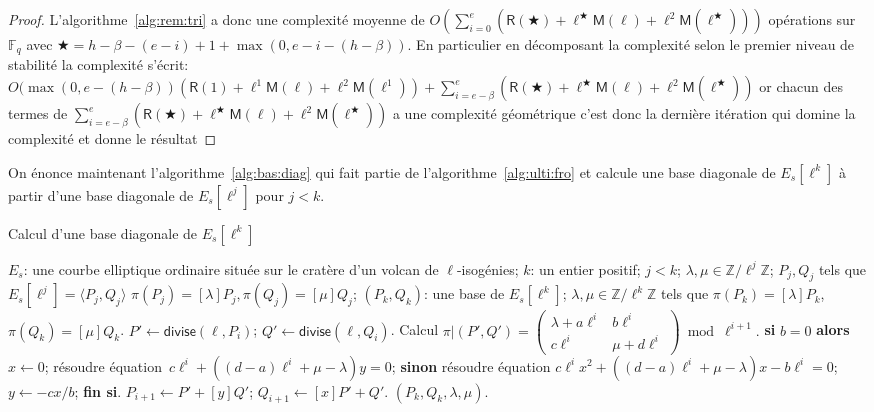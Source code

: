 \documentclass[10pt,a4paper]{book}
\theoremstyle{plain}
\theoremstyle{definition}
\theoremstyle{definition}
\theoremstyle{definition}
\theoremstyle{definition}
\theoremstyle{remark}
\theoremstyle{remark}
\theoremstyle{definition}
\begin{document}
\begin{proof}
L'algorithme~\ref{alg:rem:tri} a donc une complexité moyenne de 
$O(\sum_{i=0}^{e}(\mathsf{R}(\bigstar)+
\ell^{\bigstar}\mathsf{M}(\ell)+\ell^2 \mathsf{M}
(\ell^{\bigstar})))$ 
opérations sur $\mathbb{F}_q$ avec $\bigstar=h-\beta-(e-i)+1+\max(0,e-i-(h-\beta))$. 
En particulier en décomposant la complexité selon le premier niveau de 
stabilité la complexité s'écrit:
$
O(\max(0,e-(h-\beta))(\mathsf{R}(1)+
\ell^{1}\mathsf{M}(\ell)+\ell^2 \mathsf{M}(\ell^{1}))+
\sum_{i=e-\beta}^e(\mathsf{R}(\bigstar)+
\ell^{\bigstar}\mathsf{M}(\ell)+\ell^2 \mathsf{M}
(\ell^{\bigstar}))
$
or chacun des termes de $\sum_{i=e-\beta}^e(\mathsf{R}(\bigstar)+
\ell^{\bigstar}\mathsf{M}(\ell)+\ell^2 \mathsf{M}
(\ell^{\bigstar}))$ a une complexité géométrique c'est donc la dernière 
itération qui domine la complexité et donne le résultat
\end{proof}

On énonce maintenant l'algorithme~\ref{alg:bas:diag} qui fait partie de 
l'algorithme~\ref{alg:ulti:fro} et calcule une base diagonale de $E_s[\ell^k]$ à
partir d'une base diagonale de $E_s[\ell^j]$ pour $j<k$.

\begin{algorithm}
\caption{\label{alg:bas:diag}Calcul d'une base diagonale de $E_s[\ell^k]$}
\begin{algorithmic}[1]
\REQUIRE $E_s$: une courbe elliptique ordinaire située sur le cratère d'un volcan de $\ell$-isogénies; $k$: un entier positif; $j<k$; $\lambda, \mu \in \mathbb{Z}/\ell^{j}\mathbb{Z}$; $P_j,Q_j$ tels que $E_s[\ell^j]=\langle P_j,Q_j \rangle$ $\pi(P_j)=[\lambda] P_j, \pi(Q_j)=[\mu]Q_j$;
\ENSURE $(P_k, Q_k )$: une base de $E_s[\ell^k]$;
$\lambda, \mu \in \mathbb{Z}/\ell^k \mathbb{Z}$
tels que $\pi(P_k)= [\lambda] P_k$, $ \pi(Q_k)= [\mu] Q_k$.
\STATE\label{alg:diagonal:divide}
  $P' \leftarrow \mathsf{divise}(\ell, P_{i})$; $Q' \leftarrow \mathsf{divise} (\ell, Q_{i})$.
\STATE\label{alg:diagonal:frobenius}
  Calcul $\pi|(P',Q')=\left( \begin{smallmatrix}
\lambda + a\ell^{i} & b\ell^{i}\\
c\ell^{i} & \mu + d\ell^{i} \end{smallmatrix} \right) \bmod {\ell^{i+1}}.$
\STATE\label{alg:diagonal:solve1}
  \textbf{si} $b = 0$ \textbf{alors} $x \leftarrow 0$;
  résoudre équation~$c \ell^{i} + ((d-a) \ell^{i} + \mu-\lambda) y = 0$;
\STATE\label{alg:diagonal:solve2}
  \textbf{sinon} résoudre équation
  $c \ell^{i} x^2 + ((d-a) \ell^{i}+ \mu-\lambda) x - b \ell^{i} = 0$;
  $y \leftarrow -cx/b$; \textbf{fin si}.
\STATE\label{alg:diagonal:upd-P}
  $P_{i+1} \leftarrow P' + [y] Q'$; $Q_{i+1} \leftarrow [x] P' + Q'$.
\ENDFOR
\RETURN $(P_{k},Q_{k},\lambda,\mu).$
\end{algorithmic}
\end{algorithm}
\end{document}
